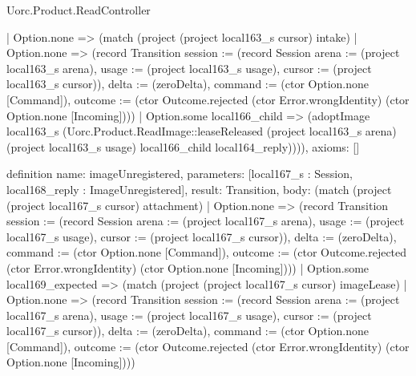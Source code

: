 \begin{lexlean}{Uorc.Product.ReadController}
\begin{semanticmodule}
{    | Option.none => (match (project (project local163_s cursor) intake)
      | Option.none => (record Transition {session := (record Session {arena := (project local163_s arena), usage := (project local163_s usage), cursor := (project local163_s cursor)}), delta := (zeroDelta), command := (ctor Option.none [Command]), outcome := (ctor Outcome.rejected (ctor Error.wrongIdentity) (ctor Option.none [Incoming]))})
      | Option.some local166_child => (adoptImage local163_s (Uorc.Product.ReadImage::leaseReleased (project local163_s arena) (project local163_s usage) local166_child local164_reply)))),
  axioms: []
}

definition{
  name: imageUnregistered,
  parameters: [local167_s : Session, local168_reply : ImageUnregistered],
  result: Transition,
  body: (match (project (project local167_s cursor) attachment)
    | Option.none => (record Transition {session := (record Session {arena := (project local167_s arena), usage := (project local167_s usage), cursor := (project local167_s cursor)}), delta := (zeroDelta), command := (ctor Option.none [Command]), outcome := (ctor Outcome.rejected (ctor Error.wrongIdentity) (ctor Option.none [Incoming]))})
    | Option.some local169_expected => (match (project (project local167_s cursor) imageLease)
      | Option.none => (record Transition {session := (record Session {arena := (project local167_s arena), usage := (project local167_s usage), cursor := (project local167_s cursor)}), delta := (zeroDelta), command := (ctor Option.none [Command]), outcome := (ctor Outcome.rejected (ctor Error.wrongIdentity) (ctor Option.none [Incoming]))})
}
\end{semanticmodule}
\end{lexlean}

